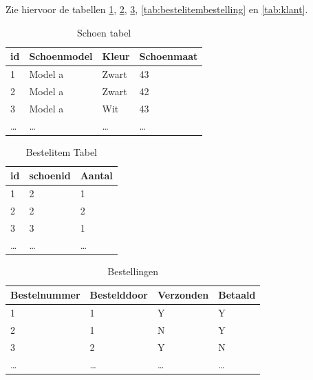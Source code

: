 \documentclass{article}
\begin{document}
Zie hiervoor de tabellen \ref{tab:schoen}, \ref{tab:bestelitem},
\ref{tab:bestellingen}, \ref{tab:bestelitembestelling} en \ref{tab:klant}.

\begin{table}[hp]
  \centering
  \begin{tabular}{l|l|l|l}
    \textbf{id} & \textbf{Schoenmodel} & \textbf{Kleur} & \textbf{Schoenmaat} \\
    \hline
    1 & Model a              & Zwart          & 43 \\
    2 & Model a              & Zwart          & 42 \\
    3 & Model a              & Wit            & 43 \\
    \ldots & \ldots          & \ldots         & \ldots \\
  \end{tabular}
  \caption{Schoen tabel}
  \label{tab:schoen}
\end{table}

\begin{table}[hp]
  \centering
  \begin{tabular}{l|l|l}
    \textbf{id} & \textbf{schoenid} & \textbf{Aantal} \\\hline
    1           & 2                 & 1               \\
    2           & 2                 & 2               \\
    3           & 3                 & 1               \\
    \ldots      & \ldots            & \ldots          \\
  \end{tabular}
  \caption{Bestelitem Tabel}
  \label{tab:bestelitem}
\end{table}

\begin{table}[hp]
  \centering
  \begin{tabular}{l|l|l|l}
    \textbf{Bestelnummer} & \textbf{Bestelddoor} & \textbf{Verzonden} 
    & \textbf{Betaald} \\
    \hline
    1 & 1                &  Y & Y \\
    2 & 1                &  N & Y \\
    3 & 2                & Y  & N \\
    \ldots & \ldots & \ldots & \ldots \\
  \end{tabular}
  \caption{Bestellingen}
  \label{tab:bestellingen}
\end{table}
\end{document}
